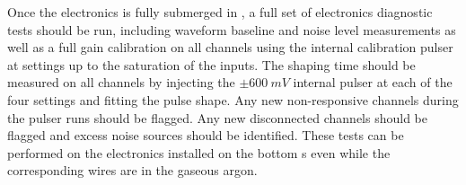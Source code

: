 Once the electronics is fully submerged in , a full 
set of electronics diagnostic tests should be run, including waveform
baseline and noise level measurements as well as a full gain calibration
on all channels using the internal calibration pulser at settings 
up to the saturation of the  inputs. The shaping time 
should be measured on all channels by injecting the $\pm\SI{600}{mV}$
internal pulser at each of the four settings and fitting the 
pulse shape. Any new non-responsive channels during the pulser 
runs should be flagged. Any new disconnected channels should be 
flagged and excess noise sources should be identified. These tests 
can be performed on the electronics installed on the bottom
s even while the corresponding wires are in 
the gaseous argon.
